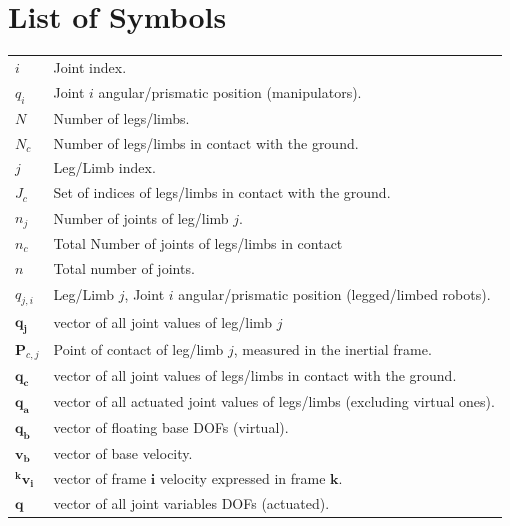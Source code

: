 \chapter*{List of Symbols} %
\label{ch:listSymbols}
\begin{table}[H]
    \begin{tabular}{ll}
        ${i}$ & Joint index.\\[2pt]
        ${q_{i}}$ & Joint $i$ angular/prismatic position (manipulators).\\[2pt]
        ${N}$ & Number of legs/limbs.\\[2pt]
        ${N_c}$ & Number of legs/limbs in contact with the ground.\\[2pt]
        ${j}$ & Leg/Limb index.\\[2pt]
        ${J_c}$ & Set of indices of legs/limbs in contact with the ground.\\[2pt]
        ${n_j}$ & Number of joints of leg/limb $j$.\\[2pt]
        ${n_c}$ & Total Number of joints of legs/limbs in contact \\[2pt]
        ${n}$ & Total number of joints.\\[2pt]
        ${q_{j,i}}$ & Leg/Limb $j$, Joint $i$ angular/prismatic position (legged/limbed robots).\\[2pt]
        ${\mathbf{q_{j}}}$ & vector of all joint values of leg/limb $j$\\[2pt]
        ${\mathbf{P}_{c,j}}$ & Point of contact of leg/limb $j$, measured in the inertial frame.\\[2pt]
        ${\mathbf{q_{c}}}$ & vector of all joint values of legs/limbs in contact with the ground.\\[2pt]
        ${\mathbf{q_{a}}}$ & vector of all actuated joint values of legs/limbs (excluding virtual ones).\\[2pt]
        ${\mathbf{q_b}}$ & vector of floating base DOFs (virtual).\\[2pt]
        ${\mathbf{v_b}}$ & vector of base velocity.\\[2pt]
        ${\mathbf{^k v_i}}$ & vector of frame $\mathbf{i}$ velocity expressed in frame $\mathbf{k}$.\\[2pt]
        ${\textbf{q}}$ & vector of all joint variables DOFs (actuated).\\[2pt]

\end{tabular}
\end{table}
